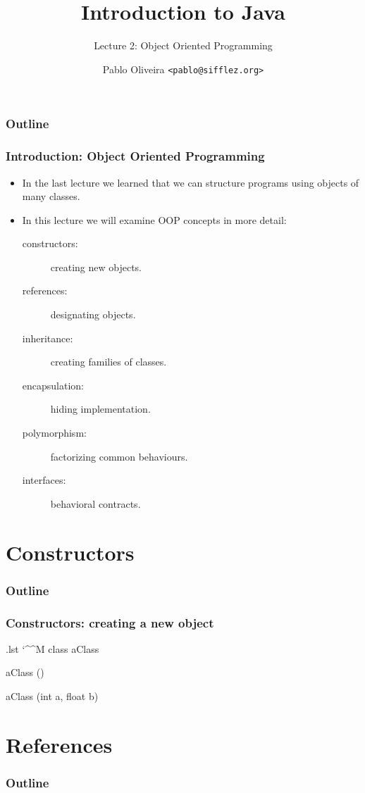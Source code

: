 \documentclass[10pt]{beamer}
\title{Introduction to Java}
\subtitle{Lecture 2: Object Oriented Programming}
\author[Pablo Oliveira]{Pablo Oliveira \texttt{<pablo@sifflez.org>}}
\institute{ENST}
\date{}
\makeatletter
\newenvironment{code}{%
  \begingroup
  \@bsphack
  \immediate\openout\lstvrb@out\jobname.lst
  \let\do\@makeother\dospecials\catcode`\^^M\active
  \def\verbatim@processline{%
    \immediate\write\lstvrb@out{\the\verbatim@line}}%
  \verbatim@start}{%
  \immediate\closeout\lstvrb@out
  \@esphack
  \endgroup
  
  \begin{alertblock}{}
    
  \end{alertblock}}
\makeatother
\begin{document}
\begin{frame}
  \titlepage
\end{frame}

\begin{frame}
  \frametitle{Outline}
  \tableofcontents
\end{frame}

\begin{frame}[fragile]
  \frametitle{Introduction: Object Oriented Programming}
  \begin{itemize}
    \item In the last lecture we learned that we can structure programs using 
          objects of many classes.
    \item In this lecture we will examine OOP concepts in more detail:
      \begin{description}
        \item[constructors:] creating new objects. 
        \item[references:] designating objects.
        \item[inheritance:] creating families of classes.
        \item[encapsulation:] hiding implementation.
        \item[polymorphism:] factorizing common behaviours.
        \item[interfaces:] behavioral contracts.
      \end{description}
    \end{itemize}
\end{frame}

\section{Constructors}
\begin{frame}
  \frametitle{Outline}
  \tableofcontents[currentsection]
\end{frame}

\begin{frame}[fragile]
\frametitle{Constructors: creating a new object}

\begin{code}
  class aClass {
    aClass () {
    }

    aClass (int a, float b) {
    }

  }
\end{code}
\end{frame}

\section{References}
\begin{frame}
  \frametitle{Outline}
  \tableofcontents[currentsection]
\end{frame}
\end{document}
